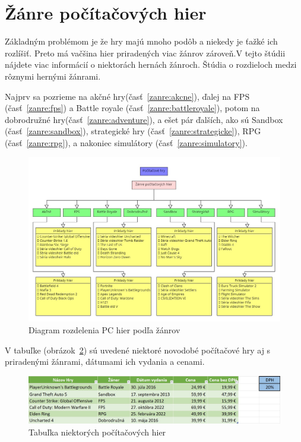 \documentclass[10pt,oneside,slovak,a4paper]{article}
\begin{document}
\section{Žánre počítačových hier} \label{zanre}

Základným problémom je že hry majú mnoho podôb a niekedy je ťažké ich rozlíšiť. Preto má vačšina hier priradených viac žánrov zároveň.V tejto štúdii nájdete viac informácií o niektorách hernách žánroch\cite{9618902}. Štúdia o rozdieloch medzi rôznymi hernými žánrami\cite{4561861}.

Najprv sa pozrieme na akčné hry(časť~\ref{zanre:akcne}), ďalej na FPS (časť~\ref{zanre:fps}) a Battle royale (časť~\ref{zanre:battleroyale}), potom na dobrodružné hry(časť~\ref{zanre:adventure}), a ešet pár ďalších, ako sú Sandbox (časť~\ref{zanre:sandbox}), strategické hry (časť~\ref{zanre:strategicke}), RPG (časť~\ref{zanre:rpg}), a nakoniec simulátory (časť~\ref{zanre:simulatory}).

\begin{figure}[h]
\centering
\includegraphics[scale=0.4]{Screenshot_4.jpg}
\caption{Diagram rozdelenia PC hier podľa žánrov}
\label{f:rpg}
\end{figure}

V tabuľke (obrázok~\ref{f:tab}) sú uvedené niektoré novodobé počítačové hry aj s priradenými žánrami, dátumami ich vydania a cenami.

\begin{figure}[h]
\centering
\includegraphics[scale=0.315]{tab.jpg}
\caption{Tabuľka niektorých počítačových hier}
\label{f:tab}
\end{figure}
\end{document}
